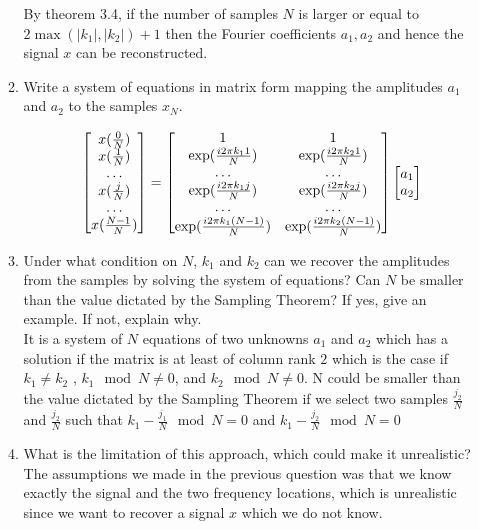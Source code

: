 \documentclass[12pt,twoside]{article}
\begin{document}
\begin{enumerate}
\begin{enumerate}
 By theorem 3.4, if the number of samples $N$ is larger or equal to $2 \max{(|k_1|, |k_2|)} + 1$ then  the Fourier coefficients $a_1,  a_2$ and hence the signal $x$ can
 be reconstructed. 
 
\item Write a system of equations in matrix form mapping the
  amplitudes $a_1$ and $a_2$ to the samples $x_{N}$. 
  
  $$\begin{bmatrix} x(\frac{0}{N}) \\ x(\frac{1}{N}) \\ \ldots \\ x(\frac{j}{N}) \\ \ldots\\ x(\frac{N-1}{N})  \end{bmatrix} 
  	= \begin{bmatrix} 1  & 1 \\  \exp (\frac{i 2 \pi k_1 1} {N} ) & \exp (\frac{i 2 \pi k_2 1} {N} )
	 \\ \ldots &  \ldots \\    \exp (\frac{i 2 \pi k_1 j} {N} ) & \exp (\frac{i 2 \pi k_2 j} {N} ) 
	 \\  \ldots &  \ldots \\    \exp (\frac{i 2 \pi k_1 (N-1)} {N} ) & \exp (\frac{i 2 \pi k_2 (N-1)} {N} )  \end{bmatrix}
	 \begin{bmatrix} a_1 \\ a_2  \end{bmatrix}$$
  
  \item Under what condition on $N$, $k_1$ and $k_2$ can we recover the
  amplitudes from the samples by solving the system of equations? 
  Can $N$ be smaller than the value dictated by the Sampling Theorem?
  If yes, give an example. If not, explain why.  \\
  It is a system of $N$ equations of two unknowns $a_1$ and $a_2$ which has a solution if the matrix is at least of column rank $2$ which is
  the case if $k_1 \neq k_2$ , $k_1 \mod N \neq 0$, and $k_2 \mod N \neq 0$. 
  N could be smaller than the value dictated by the Sampling Theorem if we select two samples $ \frac{j_2}{N}$ and $ \frac{j_2}{N}$ such that $k_1 - \frac{j_1}{N} \mod N = 0$ and $k_1 - \frac{j_2}{N} \mod N = 0$
 
  
  \item What is the limitation of this approach, which could make it unrealistic?\\
 The assumptions we made in the previous question was that we know exactly the signal and the two frequency locations, which is unrealistic since we want to recover a signal $x$ which we do not know.
   
\end{enumerate}
   

\end{enumerate}
\end{document}
